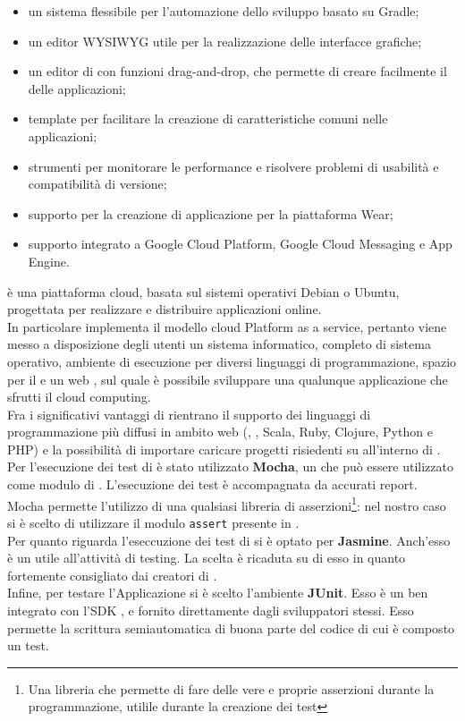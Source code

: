 		\begin{itemize}
			\item un sistema flessibile per l'automazione dello sviluppo basato su Gradle;
			\item un editor WYSIWYG utile per la realizzazione delle interfacce grafiche;
			\item un editor di  con funzioni drag-and-drop, che permette di creare facilmente il  delle applicazioni;
			\item template per facilitare la creazione di caratteristiche comuni nelle applicazioni;
			\item strumenti per monitorare le performance e risolvere problemi di usabilità e compatibilità di versione;
			\item supporto per la creazione di applicazione per la piattaforma  Wear;
			\item supporto integrato a Google Cloud Platform, Google Cloud Messaging e App Engine.
		\end{itemize}
		 è una piattaforma cloud, basata sul sistemi operativi Debian o Ubuntu, progettata per realizzare e distribuire applicazioni online. \\
		In particolare  implementa il modello cloud Platform as a service, pertanto viene messo a disposizione degli utenti un sistema informatico, completo di sistema operativo, ambiente di esecuzione per diversi linguaggi di programmazione, spazio per il  e un web , sul quale è possibile sviluppare una qualunque applicazione che sfrutti il cloud computing.\\
		Fra i significativi vantaggi di  rientrano il supporto dei linguaggi di programmazione più diffusi in ambito web (, , Scala, Ruby, Clojure, Python e PHP) e la possibilità di importare caricare progetti risiedenti su  all'interno di .
		Per l'esecuzione dei test di  è stato utilizzato \textbf{Mocha}, un   che può essere utilizzato come modulo di . L'esecuzione dei test è accompagnata da accurati report. Mocha permette l'utilizzo di una qualsiasi libreria di asserzioni\footnote{Una libreria che permette di fare delle vere e proprie asserzioni durante la programmazione, utilile durante la creazione dei test}: nel nostro caso si è scelto di utilizzare il modulo \texttt{assert} presente in .\\
		Per quanto riguarda l'eseccuzione dei test di  si è optato per \textbf{Jasmine}. Anch'esso è un   utile all'attività di testing. La scelta è ricaduta su di esso in quanto fortemente consigliato dai creatori di .\\
		Infine, per testare l'Applicazione  si è scelto l'ambiente \textbf{JUnit}. Esso è un  ben integrato con l'SDK , e fornito direttamente dagli sviluppatori stessi. Esso permette la scrittura semiautomatica di buona parte del codice di cui è composto un test.